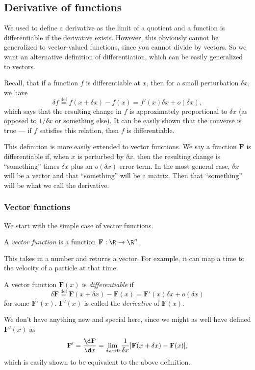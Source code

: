 \documentclass[a4paper]{article}
\begin{document}
\subsection{Derivative of functions}
We used to define a derivative as the limit of a quotient and a function is differentiable if the derivative exists. However, this obviously cannot be generalized to vector-valued functions, since you cannot divide by vectors. So we want an alternative definition of differentiation, which can be easily generalized to vectors.

Recall, that if a function $f$ is differentiable at $x$, then for a small perturbation $\delta x$, we have
\[
  \delta f \stackrel{\text{def}}{=} f(x + \delta x) - f(x) = f'(x) \delta x + o(\delta x),
\]
which says that the resulting change in $f$ is approximately proportional to $\delta x$ (as opposed to $1/\delta x$ or something else). It can be easily shown that the converse is true --- if $f$ satisfies this relation, then $f$ is differentiable.

This definition is more easily extended to vector functions. We say a function $\mathbf{F}$ is differentiable if, when $x$ is perturbed by $\delta x$, then the resulting change is ``something'' times $\delta x$ plus an $o(\delta x)$ error term. In the most general case, $\delta x$ will be a vector and that ``something'' will be a matrix. Then that ``something'' will be what we call the derivative.

\subsubsection*{Vector functions }
We start with the simple case of vector functions.
\begin{defi}
  A \emph{vector function} is a function $\mathbf{F}: \R\to \R^n$.
\end{defi}
This takes in a number and returns a vector. For example, it can map a time to the velocity of a particle at that time.

\begin{defi}
  A vector function $\mathbf{F}(x)$ is \emph{differentiable} if
  \[
    \delta \mathbf{F} \stackrel{\text{def}}{=}\mathbf{F}(x + \delta x)- \mathbf{F}(x) = \mathbf{F}'(x)\delta x + o(\delta x)
  \]
  for some $\mathbf{F}'(x)$. $\mathbf{F}'(x)$ is called the \emph{derivative} of $\mathbf{F}(x)$.
\end{defi}
We don't have anything new and special here, since we might as well have defined $\mathbf{F}'(x)$ as
\[
  \mathbf{F}' = \frac{\d \mathbf{F}}{\d x} = \lim_{\delta x \to 0} \frac{1}{\delta x}[\mathbf{F}(x + \delta x) - \mathbf{F}(x)],
\]
which is easily shown to be equivalent to the above definition.
\end{document}
